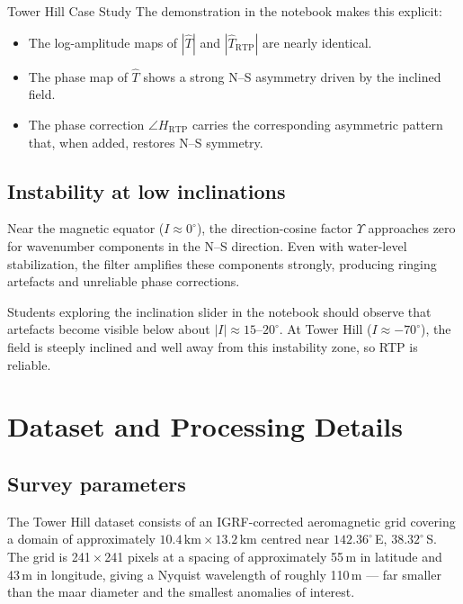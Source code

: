 \begin{activity}{Tower Hill Case Study}
The demonstration in the notebook makes this explicit:
\begin{itemize}
  \item The log-amplitude maps of $|\hat{T}|$ and $|\hat{T}_\text{RTP}|$ are
        nearly identical.
  \item The phase map of $\hat{T}$ shows a strong N--S asymmetry driven by
        the inclined field.
  \item The phase correction $\angle H_\text{RTP}$ carries the corresponding
        asymmetric pattern that, when added, restores N--S symmetry.
\end{itemize}

\subsection{Instability at low inclinations}

Near the magnetic equator ($I \approx 0^\circ$), the direction-cosine factor
$\Upsilon$ approaches zero for wavenumber components in the N--S direction.
Even with water-level stabilization, the filter amplifies these components
strongly, producing ringing artefacts and unreliable phase corrections.

Students exploring the inclination slider in the notebook should observe that
artefacts become visible below about $|I| \approx 15$--$20^\circ$.
At Tower Hill ($I \approx -70^\circ$), the field is steeply inclined and well
away from this instability zone, so RTP is reliable.

\section{Dataset and Processing Details}

\subsection{Survey parameters}

The Tower Hill dataset consists of an IGRF-corrected aeromagnetic grid
covering a domain of approximately $10.4\,\text{km} \times 13.2\,\text{km}$
centred near $142.36^\circ$\,E, $38.32^\circ$\,S.
The grid is 241\,$\times$\,241 pixels at a spacing of approximately
55\,m in latitude and 43\,m in longitude, giving a Nyquist wavelength of
roughly 110\,m --- far smaller than the maar diameter and the smallest
anomalies of interest.


\end{activity}
